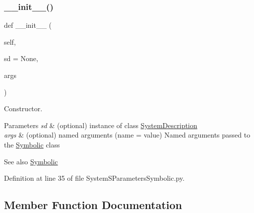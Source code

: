 \subsubsection{\texorpdfstring{\+\_\+\+\_\+init\+\_\+\+\_\+()}{\_\_init\_\_()}}
{\footnotesize\ttfamily def \+\_\+\+\_\+init\+\_\+\+\_\+ (\begin{DoxyParamCaption}\item[{}]{self,  }\item[{}]{sd = {\ttfamily None},  }\item[{}]{args }\end{DoxyParamCaption})}



Constructor. 


\begin{DoxyParams}{Parameters}
{\em sd} & (optional) instance of class \hyperlink{namespaceSignalIntegrity_1_1SystemDescriptions_1_1SystemDescription}{System\+Description} \\
\hline
{\em args} & (optional) named arguments (name = value) Named arguments passed to the \hyperlink{namespaceSignalIntegrity_1_1SystemDescriptions_1_1Symbolic}{Symbolic} class \\
\hline
\end{DoxyParams}
\begin{DoxySeeAlso}{See also}
\hyperlink{namespaceSignalIntegrity_1_1SystemDescriptions_1_1Symbolic}{Symbolic} 
\end{DoxySeeAlso}


Definition at line 35 of file System\+S\+Parameters\+Symbolic.\+py.



\subsection{Member Function Documentation}
\mbox{\label{classSignalIntegrity_1_1SystemDescriptions_1_1SystemSParametersSymbolic_1_1SystemSParametersSymbolic_af98307fa6ec51f1bd11fe6abebbb9595}} 
